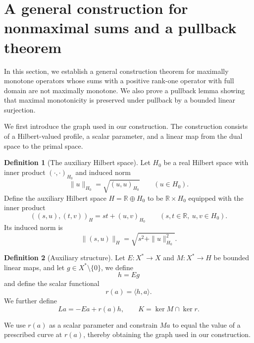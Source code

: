 \documentclass[11pt]{article}
\newcommand{\R}{\mathbb R}
\newcommand{\pair}[2]{\langle #1,#2\rangle}
\theoremstyle{definition}
\newtheorem{definition}{Definition}
\theoremstyle{remark}
\begin{document}
\section{A general construction for nonmaximal sums and a pullback theorem}
\label{sec:endpoint-criterion}

In this section, we establish a general construction theorem for maximally monotone operators whose sums with a positive rank-one operator with full domain are not maximally monotone. We also prove a pullback lemma showing that maximal monotonicity is preserved under pullback by a bounded linear surjection.  






We first introduce the graph used in our construction. The construction consists of a Hilbert-valued profile, a scalar parameter, and a linear map from the dual space to the primal space. 


\begin{definition}[The auxiliary Hilbert space]
\label{def:hilbert-spaces-norms}
Let $H_0$ be a real Hilbert space with inner product $(\cdot,\cdot)_{H_0}$ and induced norm
\[
\|u\|_{H_0}=\sqrt{(u,u)_{H_0}}\qquad(u\in H_0).
\]
Define the auxiliary Hilbert space $H=\R\oplus H_0$ to be $\R\times H_0$ equipped with the inner product
\[
((s,u),(t,v))_H=st+(u,v)_{H_0}
\qquad(s,t\in\R,\ u,v\in H_0).
\]
Its induced norm is
\[
\|(s,u)\|_H=\sqrt{s^2+\|u\|_{H_0}^2}.
\]
\end{definition}


\begin{definition}[Auxiliary structure]
\label{def:construction-maps}
Let $E:X^*\to X$ and $M:X^*\to H$ be bounded linear maps, and let
$g\in X^*\setminus\{0\}$, we define 
\[
h=Eg
\]
and define the scalar functional
\[
r(a)=\pair{h}{a}.
\]
We further define
\[
La=-Ea+r(a)h,
\qquad
K=\ker M\cap\ker r.
\]
\end{definition}



We use $r(a)$ as a scalar parameter and constrain $Ma$ to equal the value of a prescribed curve at $r(a)$, thereby obtaining the graph used in our construction. 
\end{document}
